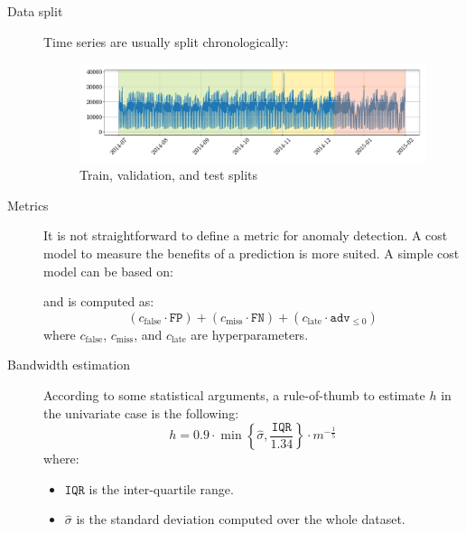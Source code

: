 \begin{description}
    \item[Data split] 
        Time series are usually split chronologically:

        \begin{figure}[H]
            \centering
            \includegraphics[width=0.8\linewidth]{./img/_ad_taxi_splits.pdf}
            \caption{Train, validation, and test splits}
        \end{figure}

    \item[Metrics] 
        It is not straightforward to define a metric for anomaly detection. A cost model to measure the benefits of a prediction is more suited. A simple cost model can be based on:
        and is computed as:
        \[ (c_\text{false} \cdot \texttt{FP}) + (c_\text{miss} \cdot \texttt{FN}) + (c_\text{late} \cdot \texttt{adv}_{\leq 0}) \]
        where $c_\text{false}$, $c_\text{miss}$, and $c_\text{late}$ are hyperparameters.

    \item[Bandwidth estimation]
        According to some statistical arguments, a rule-of-thumb to estimate $h$ in the univariate case is the following:
        \[ h = 0.9 \cdot \min\left\{ \hat{\sigma}, \frac{\texttt{IQR}}{1.34} \right\} \cdot m^{-\frac{1}{5}} \]
        where:
        \begin{itemize}
            \item $\texttt{IQR}$ is the inter-quartile range.
            \item $\hat{\sigma}$ is the standard deviation computed over the whole dataset.
        \end{itemize}


\end{description}
